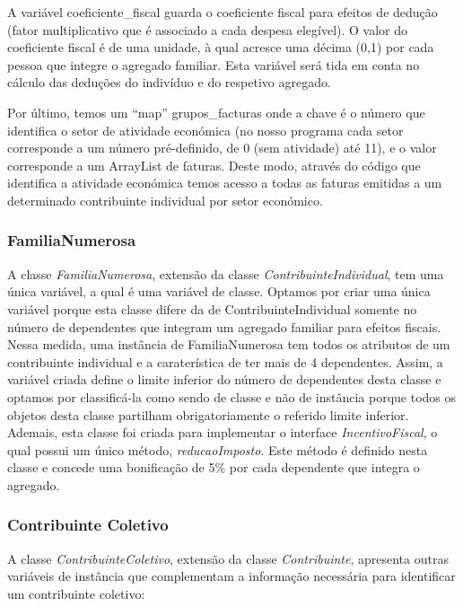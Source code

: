 \documentclass[a4paper]{article}
\begin{document}
A variável \textsf{coeficiente\_fiscal} guarda o coeficiente fiscal para efeitos
de dedução (fator multiplicativo que é associado a cada despesa elegível). O valor
do coeficiente fiscal é de uma unidade, à qual acresce uma décima (0,1) por cada pessoa que
integre o agregado familiar. Esta variável será tida em conta no cálculo das
deduções do indivíduo e do respetivo agregado.

Por último, temos um ``map'' \textsf{grupos\_facturas} onde a chave é o número
que identifica o setor de atividade económica (no nosso programa cada setor
corresponde a um número pré-definido, de 0 (sem atividade) até 11),  e o valor
corresponde a um \textsf{ArrayList} de faturas. Deste modo,
através do código que identifica a atividade económica temos acesso a todas as
faturas emitidas a um determinado contribuinte individual por setor económico.

\subsubsection{FamiliaNumerosa}
\label{sec:familianumerosa}

A classe \emph{FamiliaNumerosa}, extensão da classe \emph{ContribuinteIndividual},
tem uma única variável, a qual é uma variável de classe. Optamos por criar uma
única variável porque esta classe difere da de ContribuinteIndividual somente no
número de dependentes que integram um agregado familiar para efeitos fiscais.
Nessa medida, uma instância de FamiliaNumerosa tem todos os atributos de um contribuinte
individual e a caraterística de ter mais de 4 dependentes. Assim, a variável
criada define o limite inferior do número de dependentes desta classe e optamos
por classificá-la como sendo de classe e não de instância porque todos os objetos
desta classe partilham obrigatoriamente o referido limite inferior.
Ademais, esta classe foi criada para implementar o interface \emph{IncentivoFiscal},
o qual possui um único método, \emph{reducaoImposto}. Este método é definido nesta
classe e concede uma bonificação de 5\% por cada dependente que integra o agregado.



\vspace{0.2cm}


\subsubsection{Contribuinte Coletivo}
\label{sec:contribuintecoletivo}

A classe \emph{ContribuinteColetivo}, extensão da classe \emph{Contribuinte},
apresenta outras variáveis de instância que complementam a informação necessária
para identificar um contribuinte coletivo:
\end{document}
